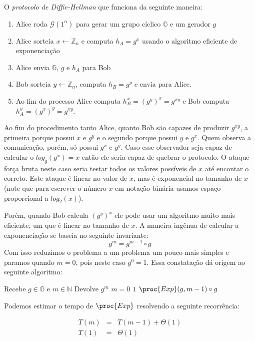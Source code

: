 O {\em protocolo de Diffie-Hellman} que funciona da seguinte maneira:
\begin{enumerate}
\item Alice roda $\mathcal{G}(1^n)$ para gerar um grupo cíclico $\mathbb{G}$ e um gerador $g$
\item Alice sorteia $x \leftarrow \mathbb{Z}_n$ e computa $h_A = g^x$ usando o algoritmo eficiente de exponenciação
\item Alice envia $\mathbb{G}$, $g$ e $h_A$ para Bob
\item Bob sorteia $y \leftarrow \mathbb{Z}_n$, computa $h_B = g^y$ e envia para Alice.
\item Ao fim do processo Alice computa $h_B^x = (g^y)^x = g^{xy}$ e Bob computa $h_A^y = (g^x)^y = g^{xy}$.
\end{enumerate}

Ao fim do procedimento tanto Alice, quanto Bob são capazes de produzir $g^{xy}$, a primeira porque possui $x$ e $g^y$ e o segundo porque possui $y$ e $g^x$.
Quem observa a comunicação, porém, só possui $g^x$ e $g^y$.
Caso esse observador seja capaz de calcular o $log_g(g^x) = x$ então ele seria capaz de quebrar o protocolo.
O ataque força bruta neste caso seria testar todos os valores possíveis de $x$ até encontar o correto.
Este ataque é linear no valor de $x$, mas é exponencial no tamanho de $x$ (note que para escrever o número $x$ em notação binária usamos espaço proporcional a $log_2(x)$).

Porém, quando Bob calcula $(g^{y})^x$ ele pode usar um algoritmo muito mais eficiente, um que é linear no tamanho de $x$.
A maneira ingênua de calcular a exponenciação se baseia no seguinte invariante:
\begin{displaymath}
  g^m = g^{m-1} \circ g
\end{displaymath}
Com isso reduzimos o problema a um problema um pouco mais simples e paramos quando $m = 0$, pois neste caso $g^0 = 1$.
Essa constatação dá origem ao seguinte algoritmo:

\begin{codebox}
\li \Comment Recebe $g \in \mathbb{G}$ e $m \in \mathbb{N}$
\li \Comment Devolve $g^m$
\li \If $m = 0 $
\li \Then \Return $1$
\End
\li \Return $\proc{Exp}(g, m-1) \circ g$
\End
\end{codebox}

Podemos estimar o tempo de $\proc{Exp}$ resolvendo a seguinte recorrência:

\begin{eqnarray*}
  T(m) & = & T(m - 1) + \Theta(1)\\
  T(1) & = & \Theta(1)
\end{eqnarray*}

